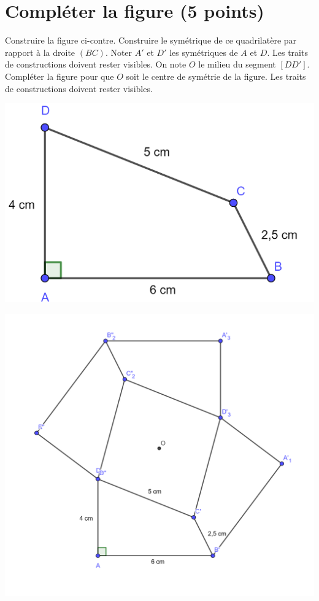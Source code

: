 \section{Compléter la figure (5 points)}

\begin{multicols}{2}
	\begin{questions}
		\question[1] Construire la figure ci-contre.
		\question[2] Construire le symétrique de ce quadrilatère par rapport à la droite $(BC)$. Noter $A'$ et $D'$ les symétriques de $A$ et $D$. Les traits de constructions doivent rester visibles.
		\question[2] On note $O$ le milieu du segment $[DD']$. Compléter la figure pour que $O$ soit le centre de symétrie de la figure. Les traits de constructions doivent rester visibles.


	\begin{center}
		\includegraphics[scale=0.25]{img/cons}
	\end{center}

	\begin{solution}
		\begin{center}
			\includegraphics[scale=0.15]{img/cons_corr}
		\end{center}		
	\end{solution}



\end{questions}
\end{multicols}
